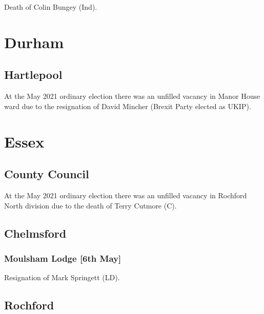 \documentclass[a4paper,openany]{book}
\begin{document}
\begin{resultsiii}

Death of Colin Bungey (Ind).

\section{Durham}

\subsection*{Hartlepool}

At the May 2021 ordinary election there was an unfilled vacancy in Manor House ward due to the resignation of David Mincher (Brexit Party elected as UKIP).

\section{Essex}

\subsection*{County Council}

At the May 2021 ordinary election there was an unfilled vacancy in Rochford North division due to the death of Terry Cutmore (C).

\subsection*{Chelmsford}

\subsubsection*{Moulsham Lodge \hspace*{\fill}\nolinebreak[1]%
	\enspace\hspace*{\fill}
	[6th May]}


Resignation of Mark Springett (LD).

\subsection*{Rochford}


\end{resultsiii}
\end{document}
